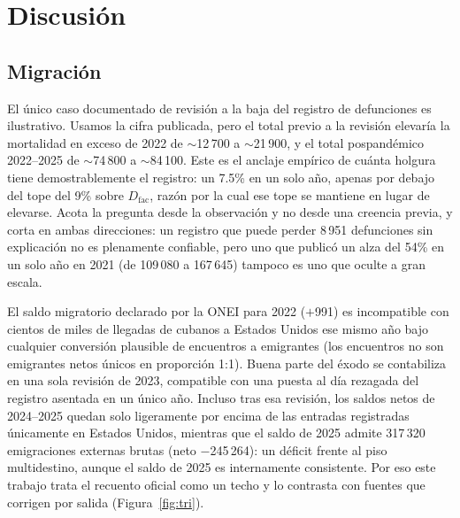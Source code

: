 \documentclass[11pt,a4paper]{article}
\begin{document}
\section{Discusión}

\subsection{Migración}



El único caso documentado de revisión a la baja del registro de defunciones es ilustrativo.
Usamos la cifra publicada, pero el total previo a la revisión elevaría la mortalidad en exceso de 2022 de $\sim$12\,700 a $\sim$21\,900, y el total pospandémico 2022--2025 de $\sim$74\,800 a $\sim$84\,100.
Este es el anclaje empírico de cuánta holgura tiene demostrablemente el registro: un 7.5\% en un solo año, apenas por debajo del tope del 9\% sobre $D_{\mathrm{fac}}$, razón por la cual ese tope se mantiene en lugar de elevarse.
Acota la pregunta desde la observación y no desde una creencia previa, y corta en ambas direcciones: un registro que puede perder 8\,951 defunciones sin explicación no es plenamente confiable, pero uno que publicó un alza del 54\% en un solo año en 2021 (de 109\,080 a 167\,645) tampoco es uno que oculte a gran escala.

El saldo migratorio declarado por la ONEI para 2022 ($+$991) es incompatible con cientos de miles de llegadas de cubanos a Estados Unidos ese mismo año bajo cualquier conversión plausible de encuentros a emigrantes (los encuentros no son emigrantes netos únicos en proporción 1:1).
Buena parte del éxodo se contabiliza en una sola revisión de 2023, compatible con una puesta al día rezagada del registro asentada en un único año.
Incluso tras esa revisión, los saldos netos de 2024--2025 quedan solo ligeramente por encima de las entradas registradas únicamente en Estados Unidos, mientras que el saldo de 2025 admite 317\,320 emigraciones externas brutas (neto $-$245\,264): un déficit frente al piso multidestino, aunque el saldo de 2025 es internamente consistente.
Por eso este trabajo trata el recuento oficial como un techo y lo contrasta con fuentes que corrigen por salida (Figura~\ref{fig:tri}).
\end{document}
